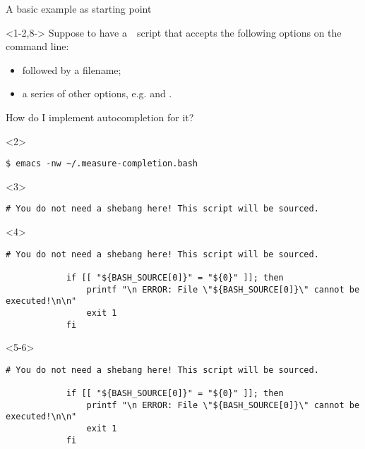 \begin{frame}[fragile]{A basic example as starting point}
    \vspace{-1mm}
    \begin{onlyenv}<1-2,8->
        Suppose to have a \,\, script that accepts the following options on the command line:
        \begin{itemize}
            \item {} followed by a filename;
            \item a series of other options, e.g.  and .
        \end{itemize}
        How do I implement autocompletion for it?
        \begin{onlyenv}<2>
            \begin{lstlisting}[style=myBash, numbers=none, aboveskip=4mm]
                $ emacs -nw ~/.measure-completion.bash
            \end{lstlisting}
        \end{onlyenv}
    \end{onlyenv}
    \begin{onlyenv}<3>
        \begin{lstlisting}[style=myBash, numbers=none, style=smaller]
            # You do not need a shebang here! This script will be sourced.
        \end{lstlisting}
    \end{onlyenv}
    \begin{onlyenv}<4>
        \begin{lstlisting}[style=myBash, numbers=none, style=smaller]
            # You do not need a shebang here! This script will be sourced.

            if [[ "${BASH_SOURCE[0]}" = "${0}" ]]; then
                printf "\n ERROR: File \"${BASH_SOURCE[0]}\" cannot be executed!\n\n"
                exit 1
            fi
        \end{lstlisting}
    \end{onlyenv}
    \begin{onlyenv}<5-6>
        \begin{lstlisting}[style=myBash, numbers=none, style=smaller]
            # You do not need a shebang here! This script will be sourced.

            if [[ "${BASH_SOURCE[0]}" = "${0}" ]]; then
                printf "\n ERROR: File \"${BASH_SOURCE[0]}\" cannot be executed!\n\n"
                exit 1
            fi


\end{lstlisting}
\end{onlyenv}
\end{frame}
